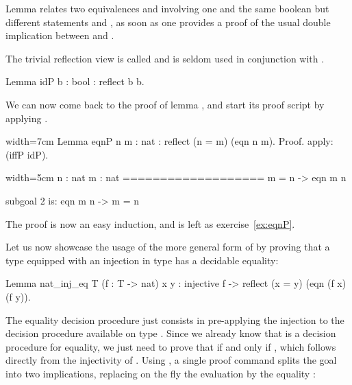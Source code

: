 Lemma  relates two equivalences 
and  involving one and the same boolean 
but different  statements  and , as soon as one
provides a proof of the usual double implication between  and
.

The trivial reflection view is called  and is seldom used
in conjunction with .

\begin{coq}{}{}
Lemma idP {b : bool} : reflect b b.
\end{coq}
We can now come back to the proof of lemma , and start its
proof script by applying .

\begin{coq-left}{}{width=7cm}
Lemma eqnP {n m : nat} :
  reflect (n = m) (eqn n m).
Proof.
apply: (iffP idP).
$~$
$~$
$~$
\end{coq-left}
\begin{coqout-right}{}{width=5cm}
n : nat
m : nat
===================
 m = n -> eqn m n

subgoal 2 is:
 eqn m n -> m = n
\end{coqout-right}

The proof is now an easy induction, and is left as exercise~\ref{ex:eqnP}.

Let us now
showcase the usage of the more general form of  by proving
that a type equipped with an injection in type  has a
decidable equality:

\begin{coq}{}{}
Lemma nat_inj_eq T (f : T -> nat) x y :
  injective f -> reflect (x = y) (eqn (f x) (f y)).
\end{coq}

The equality decision procedure just consists in pre-applying
the injection  to the decision procedure  available on
type . Since we already know that  is a decision
procedure for equality, we just need to prove that  if and
only if , which  follows directly from the injectivity of
. Using , a single proof command splits the goal into two
implications, replacing on the fly the evaluation
 by the  equality :

